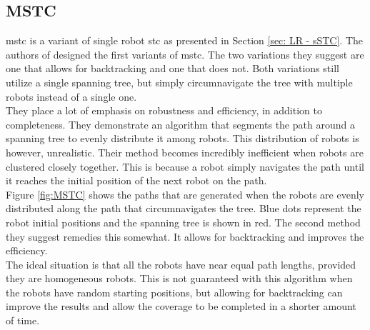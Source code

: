 \subsection{MSTC}
\label{sec:LR-MSTC}
\ac{mstc} is a variant of single robot \ac{stc} as presented in Section \ref{sec: LR - sSTC}. The authors of \cite{Hazon2005} designed the first variants of \ac{mstc}. The two variations they suggest are one that allows for backtracking and one that does not. Both variations still utilize a single spanning tree, but simply circumnavigate the tree with multiple robots instead of a single one.\\
They place a lot of emphasis on robustness and efficiency, in addition to completeness. They demonstrate an algorithm that segments the path around a spanning tree to evenly distribute it among robots. This distribution of robots is however, unrealistic. Their method becomes incredibly inefficient when robots are clustered closely together. This is because a robot simply navigates the path until it reaches the initial position of the next robot on the path.\\
Figure \ref{fig:MSTC} shows the paths that are generated when the robots are evenly distributed along the path that circumnavigates the tree. Blue dots represent the robot initial positions and the spanning tree is shown in red. The second method they suggest remedies this somewhat. It allows for backtracking and improves the efficiency.\\
The ideal situation is that all the robots have near equal path lengths, provided they are homogeneous robots. This is not guaranteed with this algorithm when the robots have random starting positions, but allowing for backtracking can improve the results and allow the coverage to be completed in a shorter amount of time.\\
